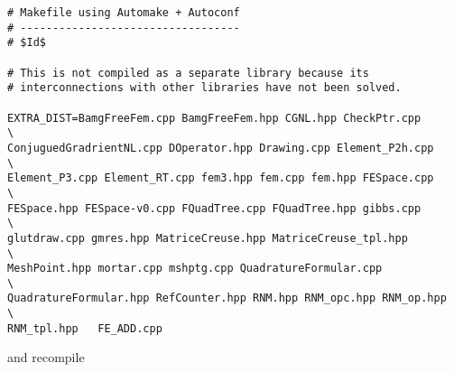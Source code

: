 \begin{verbatim}
# Makefile using Automake + Autoconf                                                             
# ----------------------------------                                                             
# $Id$                                      

# This is not compiled as a separate library because its                                         
# interconnections with other libraries have not been solved.                                    

EXTRA_DIST=BamgFreeFem.cpp BamgFreeFem.hpp CGNL.hpp CheckPtr.cpp        \
ConjuguedGradrientNL.cpp DOperator.hpp Drawing.cpp Element_P2h.cpp      \
Element_P3.cpp Element_RT.cpp fem3.hpp fem.cpp fem.hpp FESpace.cpp      \
FESpace.hpp FESpace-v0.cpp FQuadTree.cpp FQuadTree.hpp gibbs.cpp        \
glutdraw.cpp gmres.hpp MatriceCreuse.hpp MatriceCreuse_tpl.hpp          \
MeshPoint.hpp mortar.cpp mshptg.cpp QuadratureFormular.cpp              \
QuadratureFormular.hpp RefCounter.hpp RNM.hpp RNM_opc.hpp RNM_op.hpp    \
RNM_tpl.hpp   FE_ADD.cpp

\end{verbatim}

and recompile  





